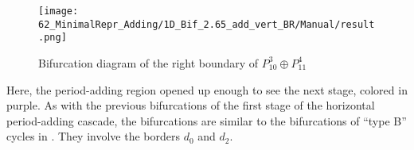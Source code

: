 \begin{figure}
	\centering
	\texttt{[image: 62\_MinimalRepr\_Adding/1D\_Bif\_2.65\_add\_vert\_BR/Manual/result.png]}
	\caption{Bifurcation diagram of the right boundary of $P_{10}^3 \oplus P_{11}^4$}
	\label{fig:minrep.add.app.vert.bif.BR}
\end{figure}

Here, the period-adding region opened up enough to see the next stage, colored in purple.
As with the previous bifurcations of the first stage of the horizontal period-adding cascade, the bifurcations are similar to the bifurcations of ``type B'' cycles in .
They involve the borders $d_0$ and $d_2$.

